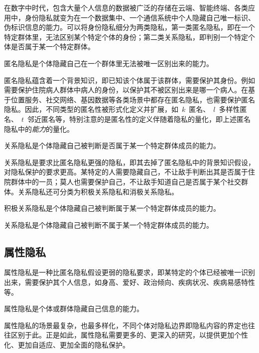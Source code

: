 在数字中时代，包含大量个人信息的数据被广泛的存储在云端、智能终端、各类应用中，身份隐私就变为在一个数据集中、一个通信系统中个人隐藏自己唯一标识、伪标识信息的能力。可以将身份隐私细分为两类隐私，第一类匿名隐私，即在一个特定群体里，无法区别某个特定个体的身份；第二类关系隐私，即判别一个特定个体是否属于某一个特定群体。
\begin{definition}
	匿名隐私是个体隐藏自己在一个群体里无法被唯一区别出来的能力。
\end{definition}

匿名隐私蕴含着一个背景知识，即已知该个体属于该群体，需要保护其身份。例如需要保护住院病人群体中病人的身份，以保护其不被区别出来是哪一个病人。在基于位置服务、社交网络、基因数据等各类场景中都存在匿名隐私，也需要保护匿名隐私。因此，不同类型的匿名性被形式化定义并扩展，如~$k$~匿名\cite{sweeney2002k}、~$l$~多样性匿名\cite{machanavajjhala2007l}、~$t$~邻近匿名\cite{li2007t}等，特别注意的是匿名性的定义伴随着隐私的量化，即上述匿名隐私中的\textit{能力}的量化。

\begin{definition}
	关系隐私是个体隐藏自己被判断是否属于某一个特定群体成员的能力。
\end{definition}

关系隐私是要求比匿名隐私更强的隐私，即其去掉了匿名隐私中的背景知识假设，对隐私保护的要求更高。某特定的人需要隐藏自己，不让敌手判断出其是否属于住院群体中的一员；莫人也需要保护自己，不让敌手知道自己是否属于某个社交群体。关系隐私还可分类为积极关系隐私和消极关系隐私。
\begin{definition}
	积极关系隐私是个体隐藏自己被判断属于某一个特定群体成员的能力。
\end{definition}

\begin{definition}
	关系隐私是个体隐藏自己被判断不属于某一个特定群体成员的能力。
\end{definition}

\subsection{属性隐私}
属性隐私是一种比匿名隐私假设更弱的隐私要求，即某特定的个体已经被唯一识别出来，需要保护其个人信息，如身高、爱好、政治倾向、疾病状况、疾病易感特性等。

\begin{definition}
	属性隐私是个体或群体隐藏自己信息的能力。
\end{definition}

属性隐私的场景最复杂，也最多样化，不同个体对隐私边界即隐私内容的界定也往往区别于此。正是如此，属性隐私需要更多的、更深入的研究，以提供更加个性化、更加自适应、更加全面的隐私保护。

